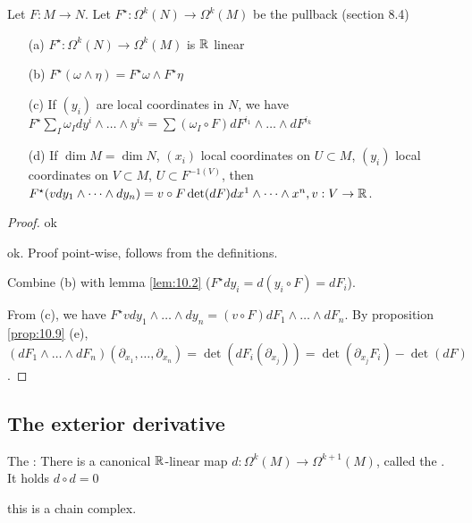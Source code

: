 \begin{lemma}\label{lem:1.10}
    Let \(F:M\to N\). Let \(F^\star:\Omega^k(N)\to\Omega^k(M)\) be the pullback (section 8.4) %
    \begin{enumerate}
        \item[(a)] \(F^\star:\Omega^k(N)\to\Omega^k(M)\) is \(\mathbb{R}\) linear 
        \item[(b)] \(F^\star(\omega\wedge \eta)=F^\star \omega\wedge F^\star \eta \)
        \item[(c)] If \((y_i)\) are local coordinates in \(N\), we have \(F^\star\sum_I \omega_I dy^i\wedge\dots\wedge y^{i_k}=\sum (\omega_I\circ F)dF^{i_1}\wedge \dots\wedge dF^{i_k}\)
        \item[(d)] If \(\dim M=\dim N\), \((x_i)\) local coordinates on \(U\subset M\), \((y_i)\) local coordinates on \(V\subset M\), \(U\subset F^{-1(V)}\),
                   then \(F^\star(vdy_1\wedge \dots \wedge dy_n)=v\circ F\det (dF)dx^1\wedge \dots \wedge x^n, v:V\to \mathbb{R}\).   
    \end{enumerate}
\end{lemma}

\begin{proof}
     ok

     ok. Proof point-wise, follows from the definitions.

     Combine (b) with lemma \ref{lem:10.2} (\(F^\star dy_i=d(y_i\circ F)=dF_i\)).

     From (c), we have \(F^\star vdy_1\wedge\dots\wedge dy_n=(v\circ F)dF_1\wedge \dots\wedge dF_n\).
    By proposition \ref{prop:10.9} (e), \((dF_1\wedge\dots\wedge dF_n)(\partial_{x_1},\dots,\partial_{x_n})=\det(dF_i(\partial_{x_j}))=\det(\partial_{x_j}F_i)-\det(dF)\).

\end{proof}

\subsection{The exterior derivative}

The : There is a canonical \(\mathbb{R}\)-linear map \(d:\Omega^k(M)\to\Omega^{k+1}(M)\), called 
the . It holds \(d\circ d=0\)
this is a chain complex.

